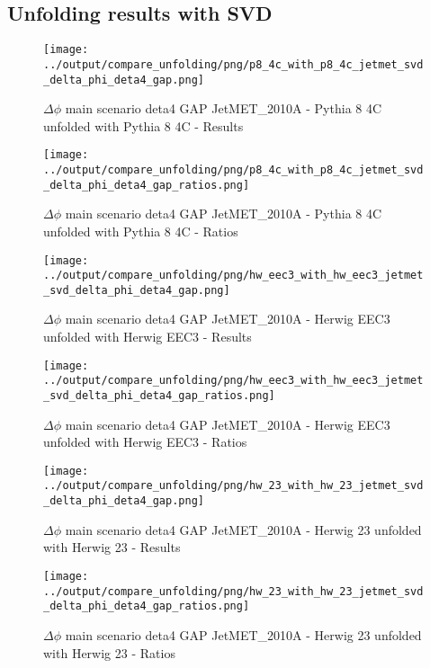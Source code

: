 \documentclass[11pt]{book}
\begin{document}
\clearpage
\subsection{Unfolding results with SVD}

\begin{figure}[ht]
\centering
\texttt{[image: ../output/compare\_unfolding/png/p8\_4c\_with\_p8\_4c\_jetmet\_svd\_delta\_phi\_deta4\_gap.png]}
\caption{$\Delta\phi$ main scenario deta4 GAP JetMET\_2010A - Pythia 8 4C unfolded with Pythia 8 4C - Results}
\label{p8_p8_jetmet_svd_delta_phi_deta4_gap_a}
\end{figure}

\begin{figure}[ht]
\centering
\texttt{[image: ../output/compare\_unfolding/png/p8\_4c\_with\_p8\_4c\_jetmet\_svd\_delta\_phi\_deta4\_gap\_ratios.png]}
\caption{$\Delta\phi$ main scenario deta4 GAP JetMET\_2010A - Pythia 8 4C unfolded with Pythia 8 4C - Ratios}
\label{p8_p8_jetmet_svd_delta_phi_deta4_gap_b}
\end{figure}

\begin{figure}[ht]
\centering
\texttt{[image: ../output/compare\_unfolding/png/hw\_eec3\_with\_hw\_eec3\_jetmet\_svd\_delta\_phi\_deta4\_gap.png]}
\caption{$\Delta\phi$ main scenario deta4 GAP JetMET\_2010A - Herwig EEC3 unfolded with Herwig EEC3 - Results}
\label{hw_eec3_hw_eec3_jetmet_svd_delta_phi_deta4_gap_a}
\end{figure}

\begin{figure}[ht]
\centering
\texttt{[image: ../output/compare\_unfolding/png/hw\_eec3\_with\_hw\_eec3\_jetmet\_svd\_delta\_phi\_deta4\_gap\_ratios.png]}
\caption{$\Delta\phi$ main scenario deta4 GAP JetMET\_2010A - Herwig EEC3 unfolded with Herwig EEC3 - Ratios}
\label{hw_eec3_hw_eec3_jetmet_svd_delta_phi_deta4_gap_b}
\end{figure}

\begin{figure}[ht]
\centering
\texttt{[image: ../output/compare\_unfolding/png/hw\_23\_with\_hw\_23\_jetmet\_svd\_delta\_phi\_deta4\_gap.png]}
\caption{$\Delta\phi$ main scenario deta4 GAP JetMET\_2010A - Herwig 23 unfolded with Herwig 23 - Results}
\label{hw_23_hw_23_jetmet_svd_delta_phi_deta4_gap_a}
\end{figure}

\begin{figure}[ht]
\centering
\texttt{[image: ../output/compare\_unfolding/png/hw\_23\_with\_hw\_23\_jetmet\_svd\_delta\_phi\_deta4\_gap\_ratios.png]}
\caption{$\Delta\phi$ main scenario deta4 GAP JetMET\_2010A - Herwig 23 unfolded with Herwig 23 - Ratios}
\label{hw_23_hw_23_jetmet_svd_delta_phi_deta4_gap_b}
\end{figure}
\end{document}
